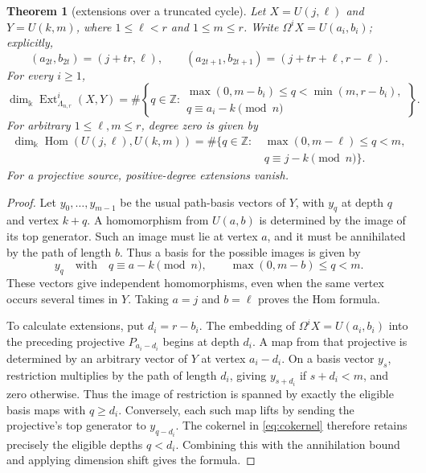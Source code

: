 \documentclass[reqno]{amsart}
\numberwithin{equation}{section}
\newtheorem{theorem}{Theorem}[section]
\theoremstyle{definition}
\theoremstyle{remark}
\DeclareMathOperator{\Hom}{Hom}
\DeclareMathOperator{\Ext}{Ext}
\newcommand{\Om}{\Omega}
\newcommand{\kk}{\Bbbk}
\newcommand{\kdim}{\dim_{\kk}}
\newcommand{\Umod}[2]{U(#1,#2)}
\begin{document}
\begin{theorem}[extensions over a truncated cycle]\label{thm:all-cyclic-ext}
Let \(X=\Umod{j}{\ell}\) and \(Y=U(k,m)\), where \(1\le\ell<r\) and \(1\le m\le r\). Write \(\Om^iX=U(a_i,b_i)\); explicitly,
\[
 (a_{2t},b_{2t})=(j+tr,\ell),\qquad
 (a_{2t+1},b_{2t+1})=(j+tr+\ell,r-\ell).
\]
For every \(i\ge1\),
\[
 \kdim\Ext_{\Lambda_{n,r}}^i(X,Y)
 =\#\left\{q\in\mathbb Z:
 \begin{array}{l}
 \max(0,m-b_i)\le q<\min(m,r-b_i),\\
 q\equiv a_i-k\pmod n
 \end{array}\right\}.
\]
For arbitrary \(1\le\ell,m\le r\), degree zero is given by
\[
\begin{aligned}
 \kdim\Hom(\Umod{j}{\ell},U(k,m))=\#\{q\in\mathbb Z:\,&\max(0,m-\ell)\le q<m,\\
 &q\equiv j-k\pmod n\}.
\end{aligned}
\]
For a projective source, positive-degree extensions vanish.
\end{theorem}
\begin{proof}
Let \(y_0,\ldots,y_{m-1}\) be the usual path-basis vectors of \(Y\), with \(y_q\) at depth \(q\) and vertex \(k+q\). A homomorphism from \(U(a,b)\) is determined by the image of its top generator. Such an image must lie at vertex \(a\), and it must be annihilated by the path of length \(b\). Thus a basis for the possible images is given by
\[
 y_q\quad\text{with}\quad q\equiv a-k\pmod n,\qquad \max(0,m-b)\le q<m.
\]
These vectors give independent homomorphisms, even when the same vertex occurs several times in \(Y\). Taking \(a=j\) and \(b=\ell\) proves the Hom formula.

To calculate extensions, put \(d_i=r-b_i\). The embedding of \(\Om^iX=U(a_i,b_i)\) into the preceding projective \(P_{a_i-d_i}\) begins at depth \(d_i\). A map from that projective is determined by an arbitrary vector of \(Y\) at vertex \(a_i-d_i\). On a basis vector \(y_s\), restriction multiplies by the path of length \(d_i\), giving \(y_{s+d_i}\) if \(s+d_i<m\), and zero otherwise. Thus the image of restriction is spanned by exactly the eligible basis maps with \(q\ge d_i\). Conversely, each such map lifts by sending the projective's top generator to \(y_{q-d_i}\). The cokernel in \eqref{eq:cokernel} therefore retains precisely the eligible depths \(q<d_i\). Combining this with the annihilation bound and applying dimension shift gives the formula.
\end{proof}
\end{document}
